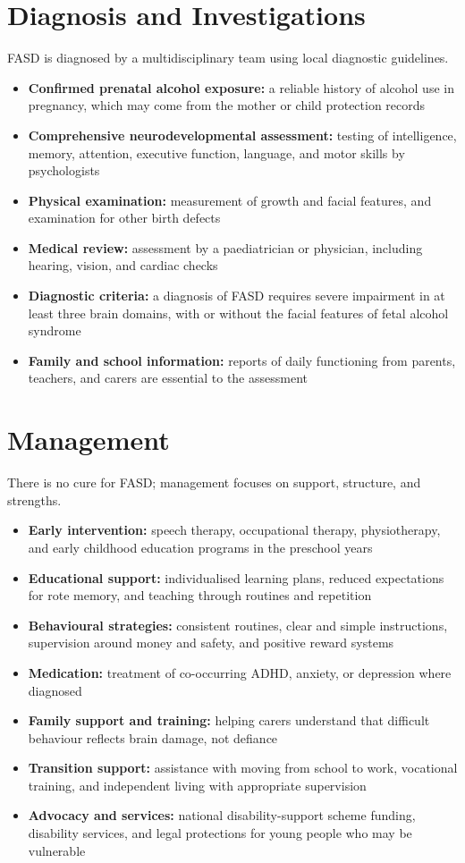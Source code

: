 \section*{Diagnosis and Investigations}
FASD is diagnosed by a multidisciplinary team using local diagnostic guidelines.
\begin{itemize}
    \item \textbf{Confirmed prenatal alcohol exposure:} a reliable history of alcohol use in pregnancy, which may come from the mother or child protection records
    \item \textbf{Comprehensive neurodevelopmental assessment:} testing of intelligence, memory, attention, executive function, language, and motor skills by psychologists
    \item \textbf{Physical examination:} measurement of growth and facial features, and examination for other birth defects
    \item \textbf{Medical review:} assessment by a paediatrician or physician, including hearing, vision, and cardiac checks
    \item \textbf{Diagnostic criteria:} a diagnosis of FASD requires severe impairment in at least three brain domains, with or without the facial features of fetal alcohol syndrome
    \item \textbf{Family and school information:} reports of daily functioning from parents, teachers, and carers are essential to the assessment
\end{itemize}

\section*{Management}
There is no cure for FASD; management focuses on support, structure, and strengths.
\begin{itemize}
    \item \textbf{Early intervention:} speech therapy, occupational therapy, physiotherapy, and early childhood education programs in the preschool years
    \item \textbf{Educational support:} individualised learning plans, reduced expectations for rote memory, and teaching through routines and repetition
    \item \textbf{Behavioural strategies:} consistent routines, clear and simple instructions, supervision around money and safety, and positive reward systems
    \item \textbf{Medication:} treatment of co-occurring ADHD, anxiety, or depression where diagnosed
    \item \textbf{Family support and training:} helping carers understand that difficult behaviour reflects brain damage, not defiance
    \item \textbf{Transition support:} assistance with moving from school to work, vocational training, and independent living with appropriate supervision
    \item \textbf{Advocacy and services:} national disability-support scheme funding, disability services, and legal protections for young people who may be vulnerable
\end{itemize}

